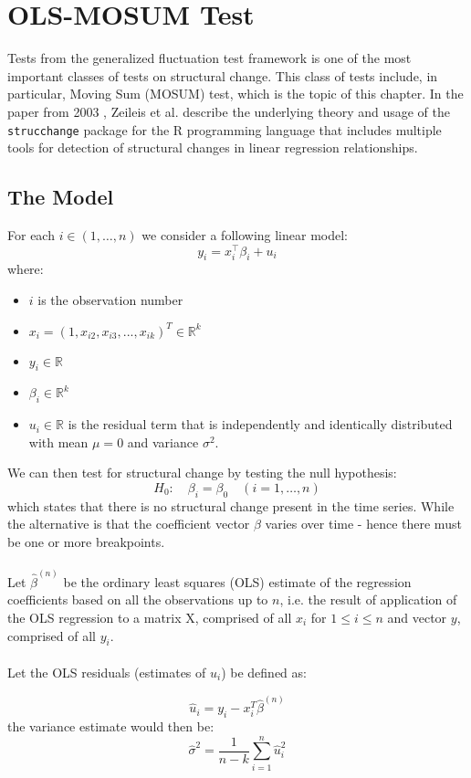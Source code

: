 \documentclass[main.tex]{subfiles}
\begin{document}
\chapter{OLS-MOSUM Test}
\label{chap:mosum}
Tests from the generalized fluctuation test framework \cite{kuan_hornik}
is one of the most important classes of tests on structural change. This class
of tests include, in particular, Moving Sum (MOSUM) test, which is the topic of this chapter.
In the paper from 2003 \cite{strucchange}, Zeileis et al. describe the
underlying theory and usage of the \texttt{strucchange} package for the
R programming language that includes multiple tools for detection of structural
changes in linear regression relationships.

\section{The Model}
\label{sec:model}
For each $i \in (1, \ldots, n)$ we consider a following linear model:
\[
y_{i}=x_{i}^{\top} \beta_{i}+u_{i}
\]
where:
\begin{itemize}
\item $i$ is the observation number
\item $x_i = (1,x_{i2}, x_{i3}, ..., x_{ik})^T \in \mathbb{R}^k$
\item $y_i \in \mathbb{R}$
\item $\beta_i \in \mathbb{R}^{k}$
\item $u_i \in \mathbb{R}$ is the residual term that is independently and identically
  distributed with mean $\mu = 0$ and variance $\sigma^2$.
\end{itemize}
We can then test for structural change by testing the null hypothesis:
\[
H_0:\quad \beta_i = \beta_0 \quad(i=1, \ldots, n)
\]
which states that there is no structural change present in the time series.
While the alternative is that the coefficient vector $\beta$ varies over time -
hence there must be one or more breakpoints. \\\\
Let $\hat{\beta}^{(n)}$ be the ordinary least squares (OLS) estimate of the
regression coefficients based on all the observations up to $n$, i.e. the
result of application of the OLS regression to a matrix $\mathrm{X}$, comprised of
all $x_i$ for $1\leq i \leq n$ and vector $y$, comprised of all $y_i$.\\\\
Let the OLS residuals (estimates of $u_i$) be defined as:

\begin{equation} \label{eq:residuals}
\hat{u}_i = y_i - x_i^T\hat{\beta}^{(n)}
\end{equation}
the variance estimate would then be:
\begin{equation} \label{eq:sigma}
\hat{\sigma}^{2}=\frac{1}{n-k} \sum_{i=1}^{n} \hat{u}_{i}^{2}
\end{equation}
\end{document}
